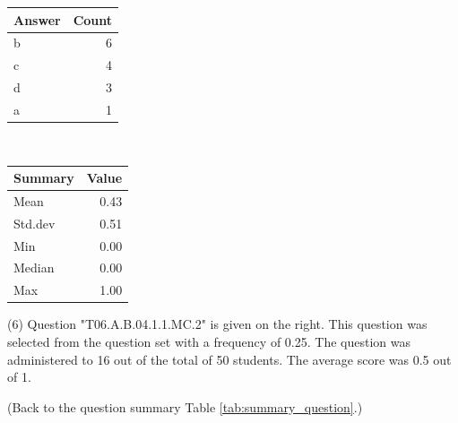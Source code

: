 \documentclass[12pt,english,nohyper]{tufte-handout}\usepackage[]{graphicx}\usepackage[]{color}
\begin{document}
\begin{center}%
\begin{tabular}{lr}
  \hline
Answer & Count \\ 
  \hline
b &   6 \\ 
  c &   4 \\ 
  d &   3 \\ 
  a &   1 \\ 
   \hline
\end{tabular}
~~~~~~~~%
\begin{tabular}{lr}
  \hline
Summary & Value \\ 
  \hline
Mean & 0.43 \\ 
  Std.dev & 0.51 \\ 
  Min & 0.00 \\ 
  Median & 0.00 \\ 
  Max & 1.00 \\ 
   \hline
\end{tabular}
\end{center}\newpage{} (6) Question "T06.A.B.04.1.1.MC.2" is given on the right. This question was selected from the question set with a frequency of 0.25. The question was administered to 16 out of the total of 50 students. The average score was 0.5 out of 1.

 (Back to the question summary Table \ref{tab:summary_question}.)
\end{document}
